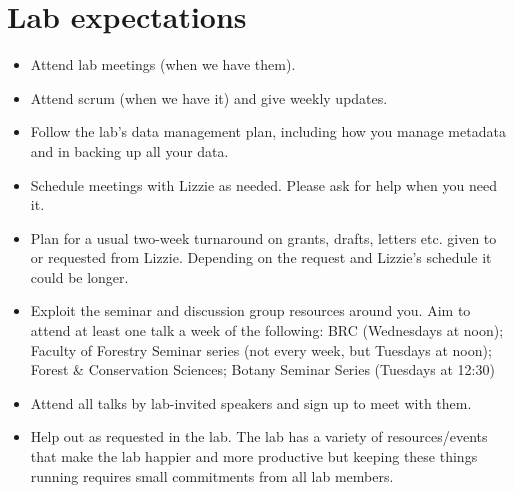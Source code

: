 \documentclass[11pt,a4paper,oneside]{article}
\begin{document}
\section{Lab expectations}
\begin{itemize}
\item Attend lab meetings (when we have them). %
\item Attend scrum (when we have it) and give weekly updates. 
\item Follow the lab's data management plan, including how you manage metadata and in backing up all your data.
\item Schedule meetings with Lizzie as needed. Please ask for help when you need it.
\item Plan for a usual two-week turnaround on grants, drafts, letters etc. given to or requested from Lizzie. Depending on the request and Lizzie's schedule it could be longer.  
\item Exploit the seminar and discussion group resources around you. Aim to attend at least one talk a week of the following: BRC (Wednesdays at noon); Faculty of Forestry Seminar series (not every week, but Tuesdays at noon); Forest \& Conservation Sciences; Botany Seminar Series (Tuesdays at 12:30)
\item Attend all talks by lab-invited speakers and sign up to meet with them. 
\item Help out as requested in the lab. The lab has a variety of resources/events that make the lab happier and more productive but keeping these things running requires small commitments from all lab members. 


\end{itemize}
\end{document}
